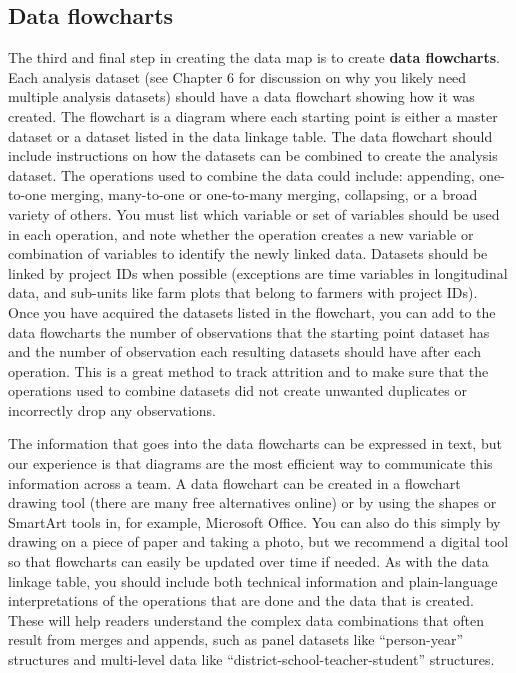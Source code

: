 \subsection{Data flowcharts}

The third and final step in creating the data map is
to create \textbf{data flowcharts}.
Each analysis dataset
(see Chapter 6 for discussion on why you likely need multiple analysis datasets)
should have a data flowchart showing how it was created.
The flowchart is a diagram
where each starting point is either a master dataset
or a dataset listed in the data linkage table.
The data flowchart should include instructions on how
the datasets can be combined to create the analysis dataset.
The operations used to combine the data could include:
appending, one-to-one merging,
many-to-one or one-to-many merging, collapsing, or a broad variety of others.
You must list which variable or set of variables
should be used in each operation,
and note whether the operation creates a new variable or combination of variables
to identify the newly linked data.
Datasets should be linked by project IDs when possible
(exceptions are time variables in longitudinal data,
and sub-units like farm plots that belong to farmers with project IDs).
Once you have acquired the datasets listed in the flowchart,
you can add to the data flowcharts the number of observations that
the starting point dataset has
and the number of observation each resulting datasets
should have after each operation.
This is a great method to track attrition and to make sure that
the operations used to combine datasets did not create unwanted duplicates
or incorrectly drop any observations.

The information that goes into the data flowcharts can be expressed in text,
but our experience is that diagrams are the most efficient way to communicate this information across a team.
A data flowchart can be created in a flowchart drawing tool
(there are many free alternatives online) or
by using the shapes or SmartArt tools in, for example, Microsoft Office.
You can also do this simply by drawing on a piece of paper and taking a photo,
but we recommend a digital tool
so that flowcharts can easily be updated over time if needed.
As with the data linkage table,
you should include both technical information
and plain-language interpretations
of the operations that are done and the data that is created.
These will help readers understand the complex data combinations
that often result from merges and appends,
such as panel datasets like ``person-year'' structures
and multi-level data like ``district-school-teacher-student'' structures.

